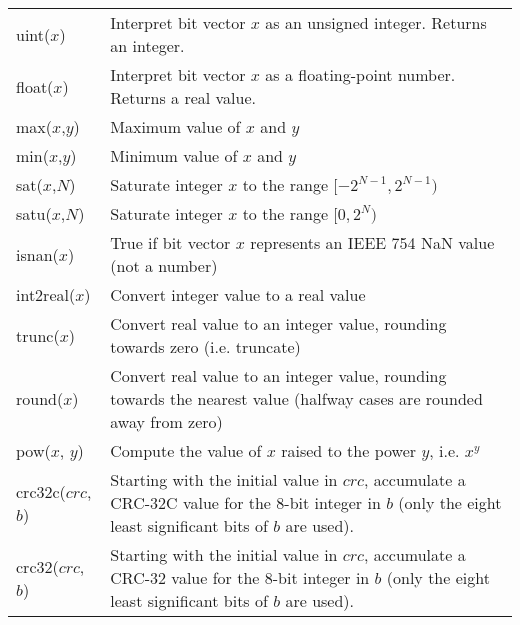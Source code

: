 \begin{tabular}{lp{340pt}}
uint($x$) & Interpret bit vector $x$ as an unsigned integer. Returns an
            integer. \\
float($x$) & Interpret bit vector $x$ as a floating-point number. Returns a real
             value. \\
max($x$,$y$) & Maximum value of $x$ and $y$ \\
min($x$,$y$) & Minimum value of $x$ and $y$ \\
sat($x$,$N$) & Saturate integer $x$ to the range $[-2^{N-1},2^{N-1})$ \\
satu($x$,$N$) & Saturate integer $x$ to the range $[0,2^{N})$ \\
isnan($x$) & True if bit vector $x$ represents an IEEE 754 NaN value (not a
             number) \\
int2real($x$) & Convert integer value to a real value \\
trunc($x$) & Convert real value to an integer value, rounding towards zero (i.e.
             truncate) \\
round($x$) & Convert real value to an integer value, rounding towards the
             nearest value (halfway cases are rounded away from zero) \\
pow($x$, $y$) & Compute the value of $x$ raised to the power $y$, i.e. $x^{y}$ \\
crc32c($crc$, $b$) & Starting with the initial value in $crc$, accumulate a CRC-32C
                     value for the 8-bit integer in $b$ (only the eight least
                     significant bits of $b$ are used). \\
crc32($crc$, $b$) & Starting with the initial value in $crc$, accumulate a CRC-32
                    value for the 8-bit integer in $b$ (only the eight least
                    significant bits of $b$ are used).
\end{tabular}

\clearpage


